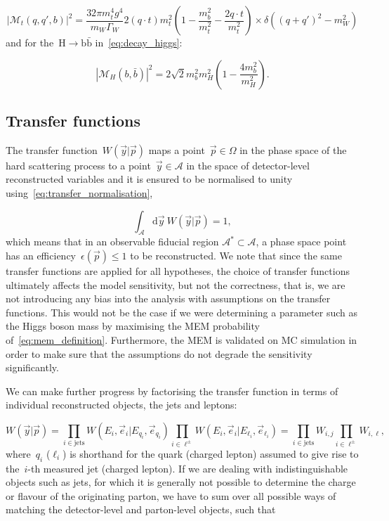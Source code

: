 \begin{equation}
\label{eq:decay_top}
|\mathcal{M}_t(q,q',b)|^2 = \frac{32\pi m_t^4 g^4}{m_W \Gamma_W} {2 (q\cdot t)}{m_t^2} (1 - \frac{m_b^2}{m_t^2} - \frac{2 q \cdot t}{m_t^2}) \times \delta((q+q')^2 - m_W^2)
\end{equation}
and for the~$\mathrm{H} \rightarrow \mathrm{b}\bar{\mathrm{b}}$ in~\cref{eq:decay_higgs}:

\begin{equation}
\label{eq:decay_higgs}
|\mathcal{M}_H(b,\bar{b})|^2 = 2\sqrt{2} m_b^2 m_H^2 (1 - \frac{4m_b^2}{m_H^2}).
\end{equation}

\subsection{Transfer functions}
\label{sec:transfer_functions}

The transfer function~$W(\vec{y} | \vec{p})$ maps a point~$\vec{p} \in \Omega$ in the phase space of the hard scattering process to a point~$\vec{y} \in \mathcal{A}$ in the space of detector-level reconstructed variables and it is ensured to be normalised to unity using~\cref{eq:transfer_normalisation},

\begin{equation}
\label{eq:transfer_normalisation}
\int_{\mathcal{A}} \mathrm{d}\vec{y}~W(\vec{y} | \vec{p}) = 1,
\end{equation}
which means that in an observable fiducial region $\mathcal{A}^* \subset \mathcal{A}$, a phase space point has an efficiency~$\epsilon(\vec{p}) \leq 1$ to be reconstructed. We note that since the same transfer functions are applied for all hypotheses, the choice of transfer functions ultimately affects the model sensitivity, but not the correctness, that is, we are not introducing any bias into the analysis with assumptions on the transfer functions. This would not be the case if we were determining a parameter such as the Higgs boson mass by maximising the MEM probability of~\cref{eq:mem_definition}. Furthermore, the MEM is validated on MC simulation in order to make sure that the assumptions do not degrade the sensitivity significantly.

We can make further progress by factorising the transfer function in terms of individual reconstructed objects, the jets and leptons:

\begin{equation}
W(\vec{y} | \vec{p}) = \prod_{i\in \mathrm{jets}} W(E_i, \vec{e}_i | E_{q_i}, \vec{e}_{q_i})
\prod_{i\in \ell^\pm} W(E_i, \vec{e}_i | E_{\ell_i}, \vec{e}_{\ell_i}) = \prod_{i \in \mathrm{jets}} W_{i,j} \prod_{i \in \ell^\pm} W_{i,\ell},
\end{equation}
where~$q_i$ ($\ell_i$) is shorthand for the quark (charged lepton) assumed to give rise to the~$i$-th measured jet (charged lepton). If we are dealing with indistinguishable objects such as jets, for which it is generally not possible to determine the charge or flavour of the originating parton, we have to sum over all possible ways of matching the detector-level and parton-level objects, such that

